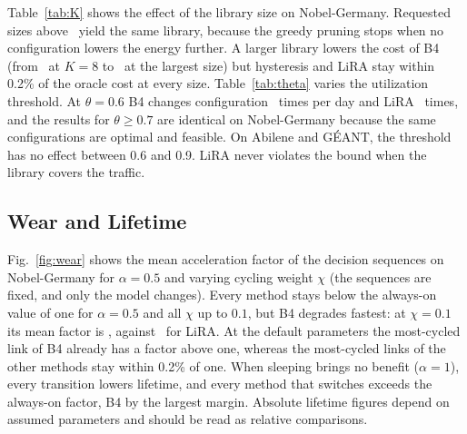 \documentclass[journal]{IEEEtran}
\begin{document}
\begin{table}[t]
\centering
\caption{Ablation of LiRA on Nobel-Germany at the Default Price (Mean over Three Seeds)}
\label{tab:ablation}
\scriptsize
\setlength{\tabcolsep}{2pt}

\end{table}

Table~\ref{tab:K} shows the effect of the library size on Nobel-Germany. Requested sizes above \KactualMax\ yield the same library, because the greedy pruning stops when no configuration lowers the energy further. A larger library lowers the cost of B4 (from \KBFouratEight\ at $K=8$ to \KBFouratSixFour\ at the largest size) but hysteresis and LiRA stay within 0.2\% of the oracle cost at every size. Table~\ref{tab:theta} varies the utilization threshold. At $\theta=0.6$ B4 changes configuration \thSixBFourchg\ times per day and LiRA \thSixLiRAchg\ times, and the results for $\theta\ge0.7$ are identical on Nobel-Germany because the same configurations are optimal and feasible. On Abilene and G\'{E}ANT, the threshold has no effect between 0.6 and 0.9. LiRA never violates the bound when the library covers the traffic.

\begin{table}[t]
\centering
\caption{Library Size on Nobel-Germany: Total Cost $J$ of Each Method (Base Scenario, Seed 0)}
\label{tab:K}
\footnotesize
\setlength{\tabcolsep}{4pt}

\end{table}

\begin{table}[t]
\centering
\caption{Utilization Threshold $\theta$ (Base Scenario, Seed 0)}
\label{tab:theta}
\footnotesize
\setlength{\tabcolsep}{4pt}

\end{table}

\subsection{Wear and Lifetime}\label{sec:res-wear}

Fig.~\ref{fig:wear} shows the mean acceleration factor of the decision sequences on Nobel-Germany for $\alpha=0.5$ and varying cycling weight $\chi$ (the sequences are fixed, and only the model changes). Every method stays below the always-on value of one for $\alpha=0.5$ and all $\chi$ up to $0.1$, but B4 degrades fastest: at $\chi=0.1$ its mean factor is \wearBigChiBFour, against \wearBigChiLiRA\ for LiRA. At the default parameters the most-cycled link of B4 already has a factor above one, whereas the most-cycled links of the other methods stay within 0.2\% of one. When sleeping brings no benefit ($\alpha=1$), every transition lowers lifetime, and every method that switches exceeds the always-on factor, B4 by the largest margin. Absolute lifetime figures depend on assumed parameters and should be read as relative comparisons.
\end{document}
